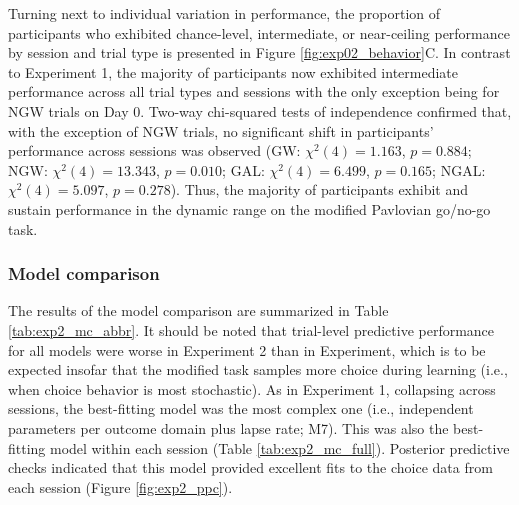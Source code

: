 \documentclass[a4paper,12pt]{article}
\begin{document}
\begin{refsection}[main]
Turning next to individual variation in performance, the proportion of participants who exhibited chance-level, intermediate, or near-ceiling performance by session and trial type is presented in Figure \ref{fig:exp02_behavior}C. In contrast to Experiment 1, the majority of participants now exhibited intermediate performance across all trial types and sessions with the only exception being for NGW trials on Day 0. Two-way chi-squared tests of independence confirmed that, with the exception of NGW trials, no significant shift in participants' performance across sessions was observed (GW: $\chi^2 (4) = 1.163$, $p = 0.884$; NGW: $\chi^2 (4) = 13.343$, $p = 0.010$; GAL: $\chi^2 (4) = 6.499$, $p = 0.165$; NGAL: $\chi^2 (4) = 5.097$, $p = 0.278$). Thus, the majority of participants exhibit and sustain performance in the dynamic range on the modified Pavlovian go/no-go task.

\subsubsection*{Model comparison}

The results of the model comparison are summarized in Table \ref{tab:exp2_mc_abbr}. It should be noted that trial-level predictive performance for all models were worse in Experiment 2 than in Experiment, which is to be expected insofar that the modified task samples more choice during learning (i.e., when choice behavior is most stochastic). As in Experiment 1, collapsing across sessions, the best-fitting model was the most complex one (i.e., independent parameters per outcome domain plus lapse rate; M7). This was also the best-fitting model within each session (Table \ref{tab:exp2_mc_full}). Posterior predictive checks indicated that this model provided excellent fits to the choice data from each session (Figure \ref{fig:exp2_ppc}). 


\end{refsection}
\end{document}
